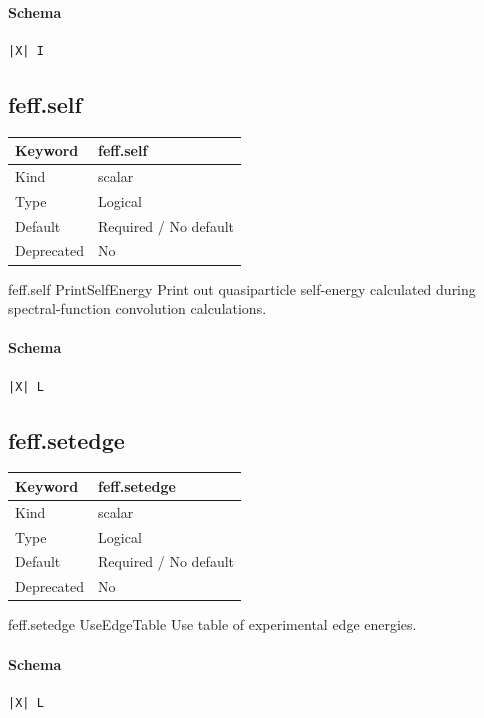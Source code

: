\documentclass[11pt]{article}
\begin{document}
{{{{\paragraph{Schema}
\begin{Verbatim}
|X| I
\end{Verbatim}

\subsection{feff.self}
\label{kw:feff-self}
\begin{longtable}{|p{1.5in}|p{4.5in}|}
\hline
Keyword & feff.self \\
\hline
Kind & scalar \\
\hline
Type & Logical \\
\hline
Default & Required / No default \\
\hline
Deprecated & No \\
\hline
\end{longtable}
 feff.self{ PrintSelfEnergy }
 Print out quasiparticle self-energy calculated during spectral-function
 convolution calculations.

\paragraph{Schema}
\begin{Verbatim}
|X| L
\end{Verbatim}

\subsection{feff.setedge}
\label{kw:feff-setedge}
\begin{longtable}{|p{1.5in}|p{4.5in}|}
\hline
Keyword & feff.setedge \\
\hline
Kind & scalar \\
\hline
Type & Logical \\
\hline
Default & Required / No default \\
\hline
Deprecated & No \\
\hline
\end{longtable}
 feff.setedge{ UseEdgeTable }
 Use table of experimental edge energies.

\paragraph{Schema}
\begin{Verbatim}
|X| L
\end{Verbatim}

}}}}
\end{document}
